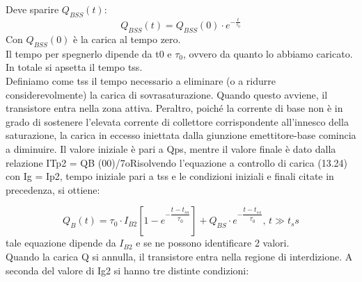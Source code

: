 Deve sparire $Q_{BSS}(t)$:
%
\begin{equation}
    Q_{BSS}(t)=Q_{BSS}(0) \cdot e^{-\frac{t}{\tau_0}}
\end{equation}
%
Con $Q_{BSS}(0)$ è la carica al tempo zero.\\
Il tempo per spegnerlo dipende da t0 e $\tau_0$, ovvero da quanto lo abbiamo caricato.\\
In totale si apsetta il tempo tss.\\
%
Definiamo come tss il tempo necessario a eliminare (o a ridurre considerevolmente) la carica di sovrasaturazione. Quando questo avviene, il transistore entra nella
zona attiva. Peraltro, poiché la corrente di base non è in grado di sostenere l'elevata corrente di collettore corrispondente all'innesco della saturazione, la carica in
eccesso iniettata dalla giunzione emettitore-base comincia a diminuire. Il valore iniziale è pari a Qps, mentre il valore finale è dato dalla relazione ITp2 = QB (00)/7oRisolvendo l'equazione a controllo di carica (13.24) con Ig = Ip2, tempo iniziale pari a tss e le condizioni iniziali e finali citate in precedenza, si ottiene: 
%

%
\begin{equation}
    Q_B(t)=\tau_0 \cdot I_{B2} \left[ 1-e^{-\dfrac{t-t_{ss}}{\tau_0}}\right] + Q_{BS} \cdot e^{-\dfrac{t-t_{ss}}{\tau_0}} \text{, } t \gg t_ss
\end{equation}
%
tale equazione dipende da $I_{B2}$ e se ne possono identificare 2 valori.\\

Quando la carica Q si annulla, il transistore entra nella regione di interdizione.
A seconda del valore di Ig2 si hanno tre distinte condizioni: 



